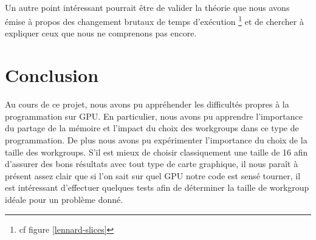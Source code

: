 \documentclass{article}
\begin{document}
\paragraph{}
Un autre point intéressant pourrait être de valider la théorie que nous avons
émise à propos des changement brutaux de temps d'exécution
\footnote{cf figure \ref{lennard-slices}} et de chercher à expliquer ceux
que nous ne comprenons pas encore.

\section{Conclusion}
Au cours de ce projet, nous avons pu appréhender les difficultés propres à la
programmation sur GPU. En particulier, nous avons pu apprendre l'importance
du partage de la mémoire et l'impact du choix des workgroups dans ce type de
programmation. De plus nous avons pu expérimenter l'importance du choix de la
taille des workgroups. S'il est mieux de choisir classiquement une taille de
16 afin d'assurer des bons résultats avec tout type de carte graphique, il
nous paraît à présent assez clair que si l'on sait sur quel GPU notre code
est sensé tourner, il est intéressant d'effectuer quelques tests afin de
déterminer la taille de workgroup idéale pour un problème donné.

\newpage

\appendix
\end{document}
